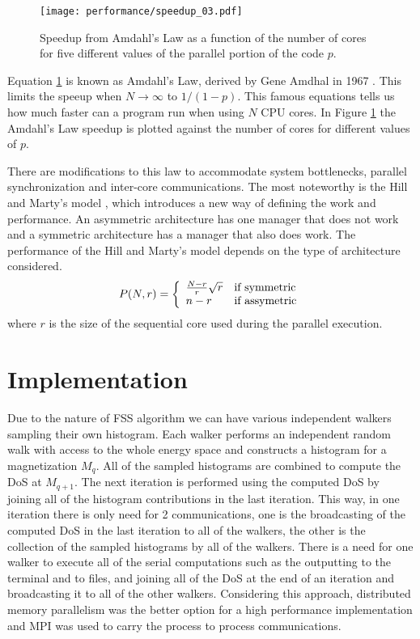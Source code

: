 \begin{figure}[h]
	\centering
	\texttt{[image: performance/speedup\_03.pdf]}
	\caption{Speedup from Amdahl's Law as a function of the number of cores for five different values of the parallel portion of the code $p$.}
	\label{amd_law}
\end{figure}

Equation \ref{amd_law} is known as Amdahl's Law, derived by Gene Amdhal in 1967 \cite{Amdahl1967}. This limits the speeup when $N \rightarrow \infty$ to $1/(1-p)$. This famous equations tells us how much faster can a program run when using $N$ CPU cores. In Figure \ref{amd_law} the Amdahl's Law speedup is plotted against the number of cores for different values of $p$.

	There are modifications to this law \cite{On2014} to accommodate system bottlenecks, parallel synchronization and inter-core communications. The most noteworthy is the Hill and Marty's model \cite{Hill2008}, which introduces a new way of defining the work and performance. An asymmetric architecture has one manager that does not work and a symmetric architecture has a manager that also does work. The performance of the Hill and Marty's model depends on the type of architecture considered. 
\begin{equation}
		P(N, r) = \left\{ \begin{array}{ll}  \frac{N-r}{r} \sqrt{r}  & \mbox{if } \text{symmetric} \\ n-r & \mbox{if } \text{assymetric} \end{array} \right.
\end{equation}
where $r$ is the size of the sequential core used during the parallel execution. 


\section{Implementation}

	Due to the nature of FSS algorithm we can have various independent walkers sampling their own histogram. Each walker performs an independent random walk with access to the whole energy space and constructs a histogram for a magnetization $M_q$. All of the sampled histograms are combined to compute the DoS at $M_{q+1}$. The next iteration is performed using the computed DoS by joining all of the histogram contributions in the last iteration.
This way, in one iteration there is only need for 2 communications, one is the broadcasting of the computed DoS in the last iteration to all of the walkers, the other is the collection of the sampled histograms by all of the walkers. There is a need for one walker to execute all of the serial computations such as the outputting to the terminal and to files, and joining all of the DoS at the end of an iteration and broadcasting it to all of the other walkers. Considering this approach, distributed memory parallelism was the better option for a high performance implementation and MPI was used to carry the process to process communications.
	
